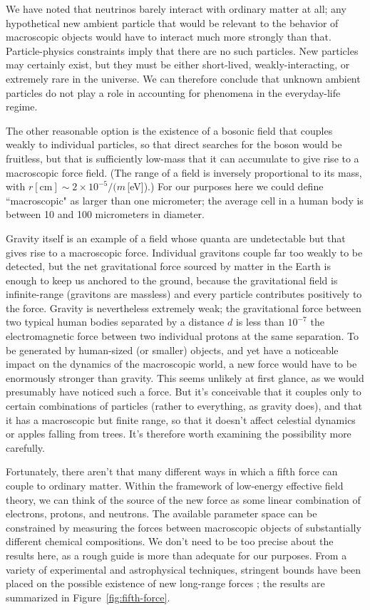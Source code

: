 \documentclass[12pt,letterpaper]{article}
\begin{document}
We have noted that neutrinos barely interact with ordinary matter at all; any hypothetical new ambient particle that would be relevant to the behavior of macroscopic objects would have to interact much more strongly than that.
Particle-physics constraints imply that there are no such particles. 
New particles may certainly exist, but they must be either short-lived, weakly-interacting, or extremely rare in the universe.
We can therefore conclude that unknown ambient particles do not play a role in accounting for phenomena in the everyday-life regime.

The other reasonable option is the existence of a bosonic field that couples weakly to individual particles, so that direct searches for the boson would be fruitless, but that is sufficiently low-mass that it can accumulate to give rise to a macroscopic force field.
(The range of a field is inversely proportional to its mass, with $r \mathrm{[cm]} \sim 2\times 10^{-5}/(m$\,[eV]).)
For our purposes here we could define ``macroscopic" as larger than one micrometer; the average cell in a human body is between 10 and 100 micrometers in diameter.

Gravity itself is an example of a field whose quanta are undetectable but that gives rise to a macroscopic force.
Individual gravitons couple far too weakly to be detected, but the net gravitational force sourced by matter in the Earth is enough to keep us anchored to the ground, because the gravitational field is infinite-range (gravitons are massless) and every particle contributes positively to the force.
Gravity is nevertheless extremely weak; the gravitational force between two typical human bodies separated by a distance $d$ is less than $10^{-7}$ the electromagnetic force between two individual protons at the same separation.
To be generated by human-sized (or smaller) objects, and yet have a noticeable impact on the dynamics of the macroscopic world, a new force would have to be enormously stronger than gravity.
This seems unlikely at first glance, as we would presumably have noticed such a force.
But it's conceivable that it couples only to certain combinations of particles (rather to everything, as gravity does), and that it has a macroscopic but finite range, so that it doesn't affect celestial dynamics or apples falling from trees.
It's therefore worth examining the possibility more carefully.

Fortunately, there aren't that many different ways in which a fifth force can couple to ordinary matter.
Within the framework of low-energy effective field theory, we can think of the source of the new force as some linear combination of electrons, protons, and neutrons.
The available parameter space can be constrained by measuring the forces between macroscopic objects of substantially different chemical compositions.
We don't need to be too precise about the results here, as a rough guide is more than adequate for our purposes.
From a variety of experimental and astrophysical techniques, stringent bounds have been placed on the possible existence of new long-range forces \citep{ADELBERGER2009102}; the results are summarized in Figure~\ref{fig:fifth-force}.
\end{document}
